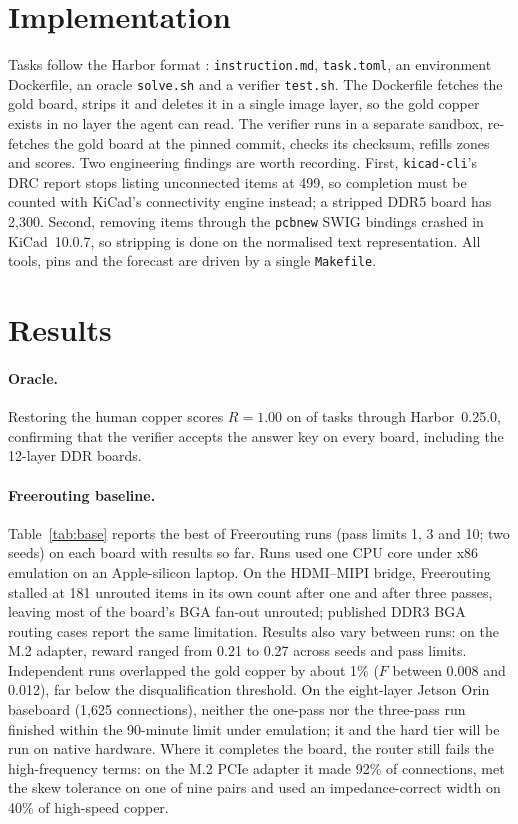 \documentclass[11pt]{article}
\begin{document}
\section{Implementation}\label{sec:impl}
Tasks follow the Harbor format \citep{harbor}: \texttt{instruction.md}, \texttt{task.toml}, an environment Dockerfile, an oracle \texttt{solve.sh} and a verifier \texttt{test.sh}. The Dockerfile fetches the gold board, strips it and deletes it in a single image layer, so the gold copper exists in no layer the agent can read. The verifier runs in a separate sandbox, re-fetches the gold board at the pinned commit, checks its checksum, refills zones and scores. Two engineering findings are worth recording. First, \texttt{kicad-cli}'s DRC report stops listing unconnected items at 499, so completion must be counted with KiCad's connectivity engine instead; a stripped DDR5 board has 2,300. Second, removing items through the \texttt{pcbnew} SWIG bindings crashed in KiCad~10.0.7, so stripping is done on the normalised text representation. All tools, pins and the forecast are driven by a single \texttt{Makefile}.

\section{Results}\label{sec:results}
\paragraph{Oracle.} Restoring the human copper scores $R=1.00$ on \noracle{} of \noracleall{} tasks through Harbor~0.25.0, confirming that the verifier accepts the answer key on every board, including the 12-layer DDR boards.

\paragraph{Freerouting baseline.} Table~\ref{tab:base} reports the best of \nruns{} Freerouting runs (pass limits 1, 3 and 10; two seeds) on each board with results so far. Runs used one CPU core under x86 emulation on an Apple-silicon laptop. On the HDMI--MIPI bridge, Freerouting stalled at 181 unrouted items in its own count after one and after three passes, leaving most of the board's BGA fan-out unrouted; published DDR3 BGA routing cases report the same limitation. Results also vary between runs: on the M.2 adapter, reward ranged from 0.21 to 0.27 across seeds and pass limits. Independent runs overlapped the gold copper by about 1\% ($F$ between 0.008 and 0.012), far below the disqualification threshold. On the eight-layer Jetson Orin baseboard (1,625 connections), neither the one-pass nor the three-pass run finished within the 90-minute limit under emulation; it and the hard tier will be run on native hardware. Where it completes the board, the router still fails the high-frequency terms: on the M.2 PCIe adapter it made 92\% of connections, met the skew tolerance on one of nine pairs and used an impedance-correct width on 40\% of high-speed copper.
\end{document}
